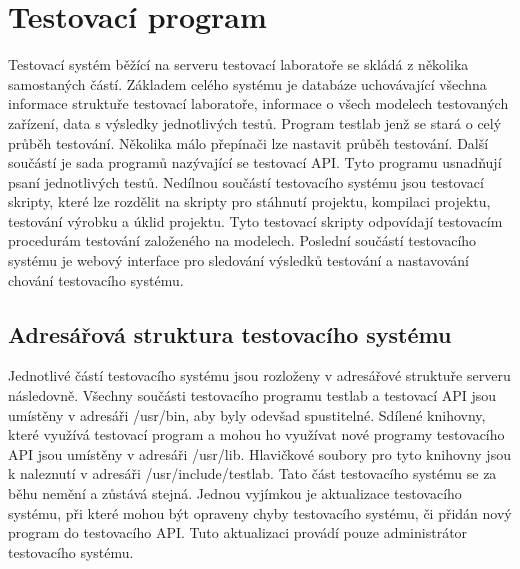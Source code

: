 \chapter{Testovací program}
Testovací systém běžící na serveru testovací laboratoře se skládá z několika samostaných částí. Základem celého systému je databáze uchovávající všechna informace struktuře testovací laboratoře, informace o všech modelech testovaných zařízení, data s výsledky jednotlivých testů. Program testlab jenž se stará o celý průběh testování. Několika málo přepínači lze nastavit průběh testování. Další součástí je sada programů nazývající se testovací API. Tyto programu usnadňují psaní jednotlivých testů. Nedílnou součástí testovacího systému jsou testovací skripty, které lze rozdělit na skripty pro stáhnutí projektu, kompilaci projektu, testování výrobku a úklid projektu. Tyto testovací skripty odpovídají testovacím procedurám testování založeného na modelech. Poslední součástí testovacího systému je webový interface pro sledování výsledků testování a nastavování chování testovacího systému.

\section{Adresářová struktura testovacího systému}

Jednotlivé částí testovacího systému jsou rozloženy v adresářové struktuře serveru následovně. Všechny součásti testovacího programu testlab a testovací API jsou umístěny v adresáři /usr/bin, aby byly odevšad spustitelné. Sdílené knihovny, které využívá testovací program a mohou ho využívat nové programy testovacího API jsou umístěny v adresáři /usr/lib. Hlavičkové soubory pro tyto knihovny jsou k naleznutí v adresáři /usr/include/testlab. Tato část testovacího systému se za běhu nemění a zůstává stejná. Jednou vyjímkou je aktualizace testovacího systému, při které mohou být opraveny chyby testovacího systému, či přidán nový program do testovacího API. Tuto aktualizaci provádí pouze administrátor testovacího systému.

